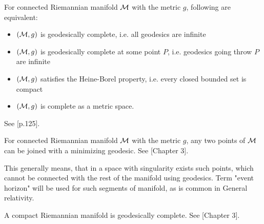 \begin{thm}
    \label{thm:hopf-Rinow}
    For connected Riemannian manifold $\mathcal{M}$ with the metric $g$, following are equivalent:
\begin{itemize}
    \item $(\mathcal{M},g)$ is geodesically complete, i.e. all geodesics are infinite
    \item $(\mathcal{M},g)$ is geodesically complete at some point $P$, i.e. geodesics going throw $P$ are infinite
    \item $(\mathcal{M},g)$ satisfies the Heine-Borel property, i.e. every closed bounded set is compact
    \item $(\mathcal{M},g)$ is complete as a metric space.
\end{itemize}
See \citet{petersen}[p.125].
\end{thm}
\begin{thm}
    \label{thm:hopf-Rinow_modified}
    For connected Riemannian manifold $\mathcal{M}$ with the metric $g$, any two points of $\mathcal{M}$ can be joined with a minimizing geodesic. See \citet{claudio}[Chapter 3].
\end{thm}
This generally means, that in a space with singularity exists such points, which cannot be connected with the rest of the manifold using geodesics. Term "event horizon" will be used for such segments of manifold, as is common in General relativity.

\begin{thm}
    \label{thm:compact}
    A compact Riemannian manifold is geodesically complete. See \citet{claudio}[Chapter 3].
\end{thm}
